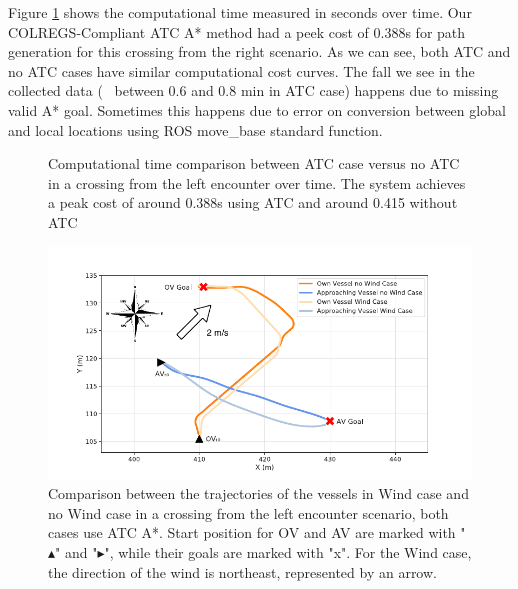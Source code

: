         Figure \ref{fig:plot_cl_w_vs_wo_CT} shows the computational time measured in seconds over time. Our \ac{COLREGS}-Compliant \ac{ATC} A* method had a peek cost of 0.388s for path generation for this crossing from the right scenario. As we can see, both \ac{ATC} and no \ac{ATC} cases have similar computational cost curves. The fall we see in the collected data (\eg{}~ between 0.6 and 0.8 min in ATC case) happens due to missing valid A* goal. Sometimes this happens due to error on conversion between global and local locations using ROS move\_base standard function.
        
        \begin{figure}[H]
            \centering
                
                \caption{Computational time comparison between \ac{ATC} case versus no \ac{ATC} in a crossing from the left encounter over time. The system achieves a peak cost of around 0.388s using \ac{ATC} and around 0.415 without \ac{ATC}}
                \label{fig:plot_cl_w_vs_wo_CT}
        \end{figure}
        
        
        \begin{figure}[H]
            \centering
            \includegraphics[width=\textwidth]{figs/Chap5/plot_cl_w_vs_wind.pdf}
            \caption{Comparison between the trajectories of the vessels in Wind case and no Wind case in a crossing from the left encounter scenario, both cases use \ac{ATC} A*. Start position for \ac{OV} and \ac{AV} are marked with "$\blacktriangle$" and "$\blacktriangleright$", while their goals are marked with "x". For the Wind case, the direction of the wind is northeast, represented by an arrow.}
            \label{fig:plot_cl_w_vs_wind}
        \end{figure}
        

